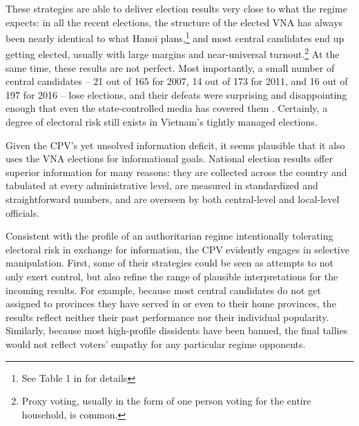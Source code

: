\documentclass[12pt]{article}
\newcommand\fnote[1]{\footnote{\baselineskip=2\normalbaselineskip#1}}
\newcommand{\1}{\mathbbm{1}}
\begin{document}
These strategies are able to deliver election results very close to what the regime expects: in all the recent elections, the structure of the elected VNA has always been nearly identical to what Hanoi plans,\fnote{See Table 1 in \citet[][506]{MaleskySchuler2011} for  details} and most central candidates end up getting elected, usually with large margins and near-universal turnout.\fnote{Proxy voting, usually in the form of one person voting for the entire household, is common.} At the same time, these results are not perfect. Most importantly, a small number of central candidates -- 21 out of 165 for 2007, 14 out of 173 for 2011, and 16 out of 197 for 2016 -- lose elections, and their defeats were surprising and disappointing enough that even the state-controlled media has covered them \citep[e.g.][]{vov2016}. Certainly, a degree of electoral risk still exists in Vietnam's tightly managed elections.

Given the CPV's yet unsolved information deficit, it seems plausible that it also uses the VNA elections for informational goals. National election results offer superior information for many reasons: they are collected across the country and tabulated at every administrative level, are measured in standardized and straightforward numbers, and are overseen by both central-level and local-level officials.

Consistent with the profile of an authoritarian regime intentionally tolerating electoral risk in exchange for information, the CPV evidently engages in selective manipulation. First, some of their strategies could be seen as attempts to not only exert control, but also refine the range of plausible interpretations for the incoming results. For example, because most central candidates do not get assigned to provinces they have served in or even to their home provinces, the results reflect neither their past performance nor their individual popularity. Similarly, because most high-profile dissidents have been banned, the final tallies would not reflect voters' empathy for any particular regime opponents.
\end{document}

